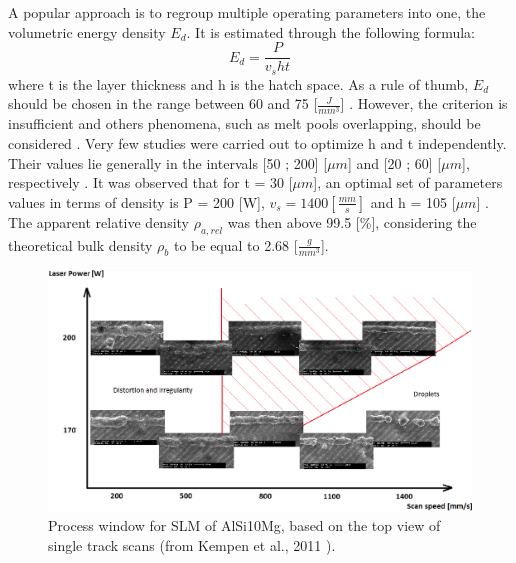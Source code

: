 A popular approach is to regroup multiple operating parameters into one, the volumetric energy density $E_d$. It is estimated through the following formula: 
$$E_d=\frac{P}{v_s h t} $$
where t is the layer thickness and h is the hatch space. As a rule of thumb, $E_d$ should be chosen in the range between 60 and 75 [$\frac{J}{mm^3}$] \parencite{Read150417}. However, the criterion is insufficient and others phenomena, such as melt pools overlapping, should be considered \parencite{Tang170309}. Very few studies were carried out to optimize h and t independently. Their values lie generally in the intervals [50 ; 200] [$\mu m$] and [20 ; 60] [$\mu m$], respectively \parencite{aboulkhair2016,Brandl121509,Kempen110817,Mertens170406}. It was observed that for t = 30 [$\mu m$], an optimal set of parameters values in terms of density is P = 200 [W], $v_s=1400 [\frac{mm}{s}]$ and h = 105 [$\mu m$] \parencite{Kempen110817}. The apparent relative density $\rho_{a,rel}$ was then above 99.5 [\%], considering the theoretical bulk density $\rho_b$ to be equal to 2.68 [$\frac{g}{mm^3}$].\\

\begin{figure}[ht]
\centering
\includegraphics[scale=0.34]{Images/Pvs}
\decoRule
\caption[Process window for SLM of AlSi10Mg, based on the top view of single track scans]{Process window for SLM of AlSi10Mg, based on the top view of single track scans (from Kempen et al., 2011 \parencite{Kempen110817}).}
\label{fig:Pvs}
\end{figure}

